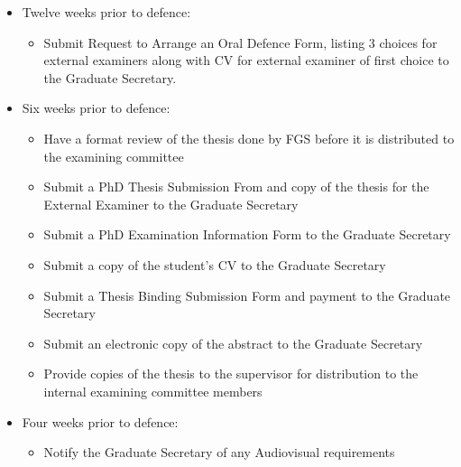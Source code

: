 \documentclass[12pt]{article}
\newcommand{\supervisor}{\index{supervisor}supervisor\xspace}
\newcommand{\GS}{Graduate Secretary\xspace}
\begin{document}
\begin{itemize}
    \item Twelve weeks prior to defence:

        \begin{itemize}

            \item Submit Request to Arrange an Oral Defence Form, listing 3
                choices for external examiners along with CV for external
                examiner of first choice to the \GS.

        \end{itemize}

    \item Six weeks prior to defence:

        \begin{itemize}

            \item Have a format review of the thesis done by FGS before it is
                distributed to the examining committee

            \item Submit a PhD Thesis Submission From and copy of the thesis
                for the External Examiner to the \GS 

            \item Submit a PhD Examination Information Form to the Graduate
                Secretary

            \item Submit a copy of the student's CV to the \GS 

            \item Submit a Thesis Binding Submission Form and payment to the
                \GS

            \item Submit an electronic copy of the abstract to the Graduate
                Secretary

            \item Provide copies of the thesis to the \supervisor for
                distribution to the internal examining committee members

        \end{itemize}

    \item Four weeks prior to defence:

        \begin{itemize}

            \item Notify the \GS of any Audiovisual requirements


\end{itemize}
\end{itemize}
\end{document}
